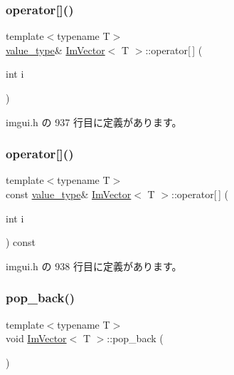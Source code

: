 \subsubsection{\texorpdfstring{operator[]()}{operator[]()}\hspace{0.1cm}{\footnotesize\ttfamily [1/2]}}
{\footnotesize\ttfamily template$<$typename T$>$ \\
\mbox{\hyperlink{class_im_vector_a8bd77e4e7581d8e5f9e98d7c2f3c2a80}{value\+\_\+type}}\& \mbox{\hyperlink{class_im_vector}{Im\+Vector}}$<$ T $>$\+::operator\mbox{[}$\,$\mbox{]} (\begin{DoxyParamCaption}\item[{int}]{i }\end{DoxyParamCaption})\hspace{0.3cm}{\ttfamily [inline]}}



 imgui.\+h の 937 行目に定義があります。

\mbox{\label{class_im_vector_ab97c3f6f1943602e36afb593c6f03ff1}} 
\subsubsection{\texorpdfstring{operator[]()}{operator[]()}\hspace{0.1cm}{\footnotesize\ttfamily [2/2]}}
{\footnotesize\ttfamily template$<$typename T$>$ \\
const \mbox{\hyperlink{class_im_vector_a8bd77e4e7581d8e5f9e98d7c2f3c2a80}{value\+\_\+type}}\& \mbox{\hyperlink{class_im_vector}{Im\+Vector}}$<$ T $>$\+::operator\mbox{[}$\,$\mbox{]} (\begin{DoxyParamCaption}\item[{int}]{i }\end{DoxyParamCaption}) const\hspace{0.3cm}{\ttfamily [inline]}}



 imgui.\+h の 938 行目に定義があります。

\mbox{\label{class_im_vector_a3db7ce62d3c429effdb893fbf7148c1c}} 
\subsubsection{\texorpdfstring{pop\+\_\+back()}{pop\_back()}}
{\footnotesize\ttfamily template$<$typename T$>$ \\
void \mbox{\hyperlink{class_im_vector}{Im\+Vector}}$<$ T $>$\+::pop\+\_\+back (\begin{DoxyParamCaption}{ }\end{DoxyParamCaption})\hspace{0.3cm}{\ttfamily [inline]}}



